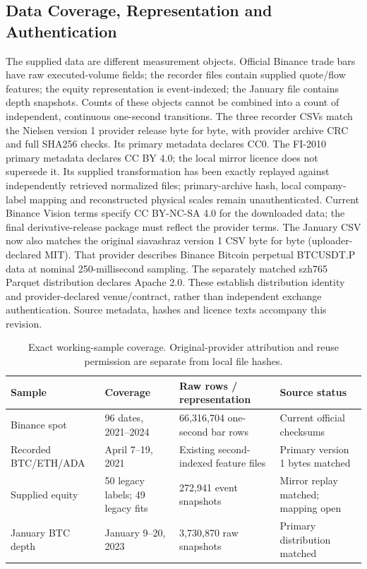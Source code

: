 \documentclass[12pt]{article}
\theoremstyle{definition}
\theoremstyle{remark}
\begin{document}
\subsection{Data Coverage, Representation and Authentication}
The supplied data are different measurement objects. Official Binance trade bars have raw executed-volume fields; the recorder files contain supplied quote/flow features; the equity representation is event-indexed; the January file contains depth snapshots. Counts of these objects cannot be combined into a count of independent, continuous one-second transitions. The three recorder CSVs match the Nielsen version 1 provider release byte for byte, with provider archive CRC and full SHA256 checks. Its primary metadata declares CC0. The FI-2010 primary metadata declares CC BY 4.0; the local mirror licence does not supersede it. Its supplied transformation has been exactly replayed against independently retrieved normalized files; primary-archive hash, local company-label mapping and reconstructed physical scales remain unauthenticated. Current Binance Vision terms specify CC BY-NC-SA 4.0 for the downloaded data; the final derivative-release package must reflect the provider terms. The January CSV now also matches the original siavashraz version 1 CSV byte for byte (uploader-declared MIT). That provider describes Binance Bitcoin perpetual BTCUSDT.P data at nominal 250-millisecond sampling. The separately matched szh765 Parquet distribution declares Apache 2.0. These establish distribution identity and provider-declared venue/contract, rather than independent exchange authentication. Source metadata, hashes and licence texts accompany this revision. 
\begin{table}[htbp]
\centering\footnotesize\setlength{\tabcolsep}{3pt}
\caption{Exact working-sample coverage. Original-provider attribution and reuse permission are separate from local file hashes.}
\label{tab:datasets}
\begin{tabularx}{\textwidth}{lXXX}\toprule
Sample & Coverage & Raw rows / representation & Source status \\\midrule
Binance spot & 96 dates, 2021--2024 & 66,316,704 one-second bar rows & Current official checksums \\
Recorded BTC/ETH/ADA & April 7--19, 2021 & Existing second-indexed feature files & Primary version 1 bytes matched \\
Supplied equity & 50 legacy labels; 49 legacy fits & 272,941 event snapshots & Mirror replay matched; mapping open \\
January BTC depth & January 9--20, 2023 & 3,730,870 raw snapshots & Primary distribution matched \\
\bottomrule\end{tabularx}
\end{table}
\end{document}
